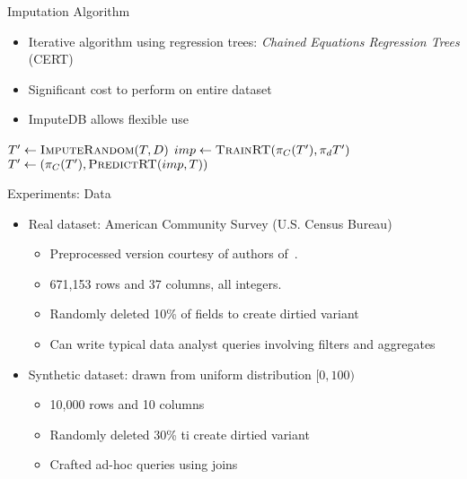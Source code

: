 \documentclass{beamer}
\newcommand{\ProjectName}{ImputeDB}
\begin{document}
\begin{frame}[fragile]{Imputation Algorithm}
\begin{itemize}
	\item Iterative algorithm using regression trees: \textit{Chained Equations Regression Trees} (CERT)\cite{burgette2010multiple}
	\item Significant cost to perform on entire dataset
	\item \ProjectName{} allows flexible use
\end{itemize}

\begin{algorithm}[H]
  \scriptsize
  \begin{algorithmic}
    
    	\State $T' \gets \Call{ImputeRandom}{T, D}$
			\State $imp \gets \Call{TrainRT}{\pi_C(T'), \pi_d{T'}}$
			\State $T' \gets (\pi_C(T'), \Call{PredictRT}{imp, T})$
		\EndFor
	\EndFor
	\EndFunction
  \end{algorithmic}
  \caption{An algorithm for chained imputation using regression trees}
  \label{algo:imputation-strategy}
\end{algorithm}
\end{frame}

\begin{frame}[fragile]{Experiments: Data}
\begin{itemize}
	\item Real dataset: American Community Survey (U.S. Census Bureau)
		\begin{itemize}
			\item Preprocessed version courtesy of authors of~\cite{akande2015empirical}.
			\item 671,153 rows and 37 columns, all integers.
			\item Randomly deleted 10\% of fields to create dirtied variant
			\item Can write typical data analyst queries involving filters and aggregates
		\end{itemize}
	\item Synthetic dataset: drawn from uniform distribution $[0,100)$
		\begin{itemize}
			\item10,000 rows and 10 columns
			\item Randomly deleted 30\% ti create dirtied variant
			\item Crafted ad-hoc queries using joins
		\end{itemize}
\end{itemize}
\end{frame}
\end{document}
